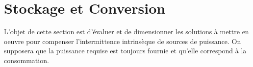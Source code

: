 \documentclass[12pt,french]{article}
\begin{document}
\section{Stockage et Conversion}
L'objet de cette section est d'évaluer et de dimensionner les solutions à mettre en oeuvre pour compenser l'intermittence intrinsèque de sources de puissance. On supposera que la puissance requise est toujours fournie et qu'elle correspond à la consommation.


%	
%	
%	
%	
%	
\end{document}
